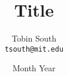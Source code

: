 \documentclass{article}
\title{Title}
\date{Month Year}
\author{Tobin South\\\texttt{tsouth@mit.edu} \\}
\begin{document}
\maketitle

\begin{abstract}

\end{abstract}

% 
% 
\end{document}
